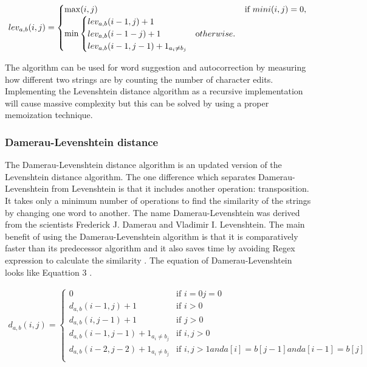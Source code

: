 \begin{equation}
	\begin{aligned}
		\label{eq:levdist}	
		lev_{a,b}(i,j) = 
		\begin{cases}
			\max(i,j) & \text {if } mini(i,j) = 0,\\    
			\min 
			\begin{cases}
				lev_{a,b}(i-1,j) + 1 \\
			    lev_{a,b}(i-1-j) + 1 & \text                     otherwise. \\ 
			    lev_{a,b}(i-1,j-1) + 1_{a_i\neq b_j} 	
			\end{cases}
		\end{cases}
	\end{aligned}
\end{equation}


The algorithm can be used for word suggestion and autocorrection by measuring how different two strings are by counting the number of character edits. Implementing the Levenshtein distance algorithm as a recursive implementation will cause massive complexity but this can be solved by using a proper memoization technique.

\subsubsection{Damerau-Levenshtein distance}
The Damerau-Levenshtein distance algorithm is an updated version of the Levenshtein distance algorithm. The one difference which separates  Damerau-Levenshtein from Levenshtein is that it includes another operation: transposition. It takes only a minimum number of operations to find the similarity of the strings by changing one word to another. The name Damerau-Levenshtein was derived from the scientists Frederick J. Damerau and Vladimir I. Levenshtein. The main benefit of using the Damerau-Levenshtein algorithm is that it is comparatively faster than its predecessor algorithm and it also saves time by avoiding Regex expression to calculate the similarity \cite{ChSa2019}. The equation of Damerau-Levenshtein looks like Equattion 3 \cite{DamLeven}.

\begin{equation}
	\begin{aligned}
		\label{eq:dlevidist}	
		d_{a,b}(i,j) = 
		\begin{cases}
			0 & \text {if } i = 0 j = 0\\
			d_{a,b}(i-1,j) + 1 & \text {if } i > 0\\
			d_{a,b}(i,j-1) + 1 & \text {if } j > 0\\
			d_{a,b}(i-1,j-1) + 1_{a_i\neq b_j} & \text {if } i,j > 0\\
			d_{a,b}(i-2,j-2) + 1_{a_i\neq b_j} & \text {if } i,j > 1 and a[i] = b[j-1] and a[i-1] = b[j]\\
		\end{cases}
	\end{aligned}
\end{equation}

